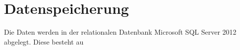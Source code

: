 \chapter{Datenspeicherung}

Die Daten werden in der relationalen Datenbank Microsoft SQL Server 2012 abgelegt. Diese besteht au